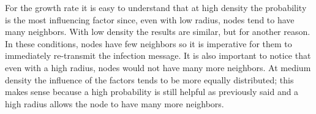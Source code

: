 For the growth rate it is easy to understand that at high density the probability is the most influencing factor since, even with low radius, nodes tend to have many neighbors. With low density the results are similar, but for another reason. In these conditions, nodes have few neighbors so it is imperative for them to immediately re-transmit the infection message. It is also important to notice that even with a high radius, nodes would not have many more neighbors. At medium density the influence of the factors tends to be more equally distributed; this makes sense because a high probability is still helpful as previously said and a high radius allows the node to have many more neighbors.

\fi